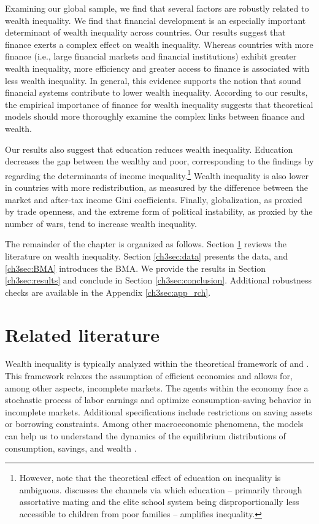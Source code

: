 \begin{refsection}
Examining our global sample, we find that several factors are robustly related to wealth inequality. We find that financial development is an especially important determinant of wealth inequality across countries. Our results suggest that finance exerts a complex effect on wealth inequality. Whereas countries with more finance (i.e., large financial markets and financial institutions) exhibit greater wealth inequality, more efficiency and greater access to finance is associated with less wealth inequality. In general, this evidence supports the notion that sound financial systems contribute to lower wealth inequality. According to our results, the empirical importance of finance for wealth inequality suggests that theoretical models should more thoroughly examine the complex links between finance and wealth.

Our results also suggest that education reduces wealth inequality. Education decreases the gap between the wealthy and poor, corresponding to the findings by \textcite{dabla2015causes} regarding the determinants of income inequality.\footnote{However, note that the theoretical effect of education on inequality is ambiguous. \textcite{scheidel} discusses the channels via which education -- primarily through assortative mating and the elite school system being disproportionally less accessible to children from poor families -- amplifies inequality.} Wealth inequality is also lower in countries with more redistribution, as measured by the difference between the market and after-tax income Gini coefficients. Finally, globalization, as proxied by trade openness, and the extreme form of political instability, as proxied by the number of wars, tend to increase wealth inequality. 

The remainder of the chapter is organized as follows. Section \ref{ch3sec:literature} reviews the literature on wealth inequality. Section \ref{ch3sec:data} presents the data, and \ref{ch3sec:BMA} introduces the \ac{BMA}. We provide the results in Section \ref{ch3sec:results} and conclude in Section \ref{ch3sec:conclusion}. Additional robustness checks are available in the Appendix \ref{ch3sec:app_rch}.
%
%
%
%
%
\section{Related literature}\label{ch3sec:literature}
Wealth inequality is typically analyzed within the theoretical framework of \textcite{bewley1977permanent} and \textcite{Ayiagari1994}. This framework relaxes the assumption of efficient economies and allows for, among other aspects, incomplete markets. The agents within the economy face a stochastic process of labor earnings and optimize consumption-saving behavior in incomplete markets. Additional specifications include restrictions on saving assets or borrowing constraints. Among other macroeconomic phenomena, the models can help us to understand the dynamics of the equilibrium distributions of consumption, savings, and wealth \parencite{BENHABIB2015489}.


\end{refsection}

